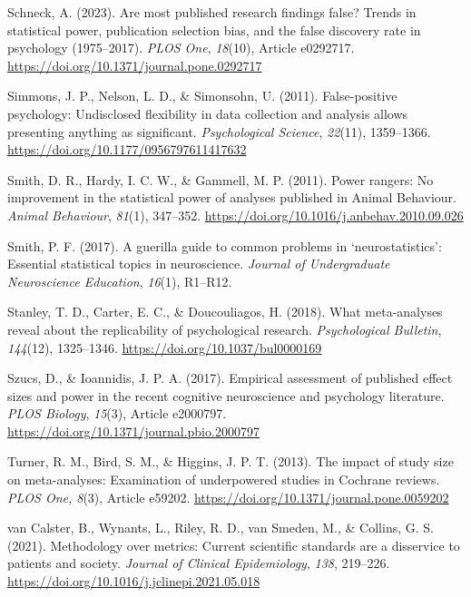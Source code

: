 \documentclass[authordate, meta]{jote-new-article}
\begin{document}
	Schneck, A. (2023). Are most published research findings false? Trends in statistical power, publication selection bias, and the false discovery rate in psychology (1975--2017). \emph{PLOS One}, \emph{18}(10), Article e0292717. \url{https://doi.org/10.1371/journal.pone.0292717}



	Simmons, J. P., Nelson, L. D., \& Simonsohn, U. (2011). False-positive psychology: Undisclosed flexibility in data collection and analysis allows presenting anything as significant. \emph{Psychological Science}, \emph{22}(11), 1359--1366. \url{https://doi.org/10.1177/0956797611417632}



	Smith, D. R., Hardy, I. C. W., \& Gammell, M. P. (2011). Power rangers: No improvement in the statistical power of analyses published in Animal Behaviour. \emph{Animal Behaviour}, \emph{81}(1), 347--352. \url{https://doi.org/10.1016/j.anbehav.2010.09.026}



	Smith, P. F. (2017). A guerilla guide to common problems in ‘neurostatistics': Essential statistical topics in neuroscience. \emph{Journal of Undergraduate Neuroscience Education}, \emph{16}(1), R1--R12.



	Stanley, T. D., Carter, E. C., \& Doucouliagos, H. (2018). What meta-analyses reveal about the replicability of psychological research. \emph{Psychological Bulletin}, \emph{144}(12), 1325--1346. \url{https://doi.org/10.1037/bul0000169}



	Szucs, D., \& Ioannidis, J. P. A. (2017). Empirical assessment of published effect sizes and power in the recent cognitive neuroscience and psychology literature. \emph{PLOS Biology}, \emph{15}(3), Article e2000797. \url{https://doi.org/10.1371/journal.pbio.2000797}



	Turner, R. M., Bird, S. M., \& Higgins, J. P. T. (2013). The impact of study size on meta-analyses: Examination of underpowered studies in Cochrane reviews. \emph{PLOS One, 8}(3), Article e59202. \url{https://doi.org/10.1371/journal.pone.0059202}



	van Calster, B., Wynants, L., Riley, R. D., van Smeden, M., \& Collins, G. S. (2021). Methodology over metrics: Current scientific standards are a disservice to patients and society. \emph{Journal of Clinical Epidemiology}, \emph{138}, 219--226. \url{https://doi.org/10.1016/j.jclinepi.2021.05.018}
\end{document}
